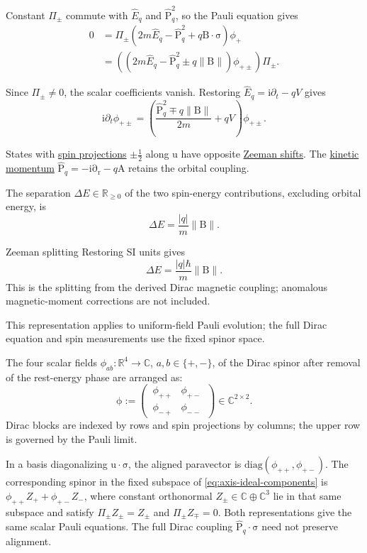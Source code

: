 \documentclass[11pt]{article}
\newcommand{\pv}[1]{{#1}}
\newcommand{\pvGreek}[1]{{#1}}
\newcommand{\vstyle}[1]{{\bm{\mathrm{#1}}}}
\newcommand{\pZ}{\pv{Z}}
\newcommand{\pvPi}{\pvGreek{\Pi}}
\newcommand{\pvphi}{\pvGreek{\phi}}
\numberwithin{equation}{section}
\newcommand{\R}{\mathbb{R}}
\newcommand{\C}{\mathbb{C}}
\newcommand{\ii}{\mathrm{i}}
\newcommand{\dotprod}{\cdot}
\newcommand{\bsig}{\vstyle{\sigma}}
\newcommand{\br}{\vstyle{r}}
\newcommand{\bBf}{\vstyle{B}}
\newcommand{\bp}{\vstyle{P}}
\newcommand{\hEq}{\hat E_q}
\newcommand{\hbpq}{\hat{\bp}_q}
\newcommand{\pdr}{\vstyle{\partial}_{\br}}
\begin{document}
Constant $\pvPi_\pm$ commute with $\hEq$ and $\hbpq^2$,
so the Pauli equation gives
\[
\begin{aligned}
0&=\pvPi_\pm(2m\hEq-\hbpq^2+q\vstyle{B}\dotprod\bsig)\pvphi_+\\
&=((2m\hEq-\hbpq^2
\pm q\lVert\vstyle{B}\rVert)\phi_{+\pm})\pvPi_\pm.
\end{aligned}
\]

Since $\pvPi_\pm\ne0$, the scalar coefficients vanish.
Restoring $\hEq=\ii\partial_t-qV$ gives
\[
\boxed{\ii\partial_t\phi_{+\pm}=
\left(\frac{\hbpq^2\mp q\lVert\vstyle{B}\rVert}{2m}+qV\right)\phi_{+\pm}.}
\]

States with \hyperref[sec:spin-half]{spin projections} $\pm\tfrac12$ along $\vstyle{u}$ have opposite
\hyperref[sec:uniform-spin]{Zeeman shifts}. The
\hyperref[eq:mechanical-momentum-operator]{kinetic momentum}
$\hbpq=-\ii\pdr-q\vstyle{A}$ retains the orbital coupling.

The separation $\Delta E\in\R_{\ge0}$ of the two spin-energy contributions, excluding
orbital energy, is
\[
 \Delta E=\frac{|q|}{m}\lVert\bBf\rVert.
\]
\begin{SIunits}{Zeeman splitting}
Restoring SI units gives
\[
 \Delta E=\frac{|q|\hbar}{m}\lVert\bBf\rVert.
\]
This is the splitting from the derived Dirac magnetic coupling; anomalous
magnetic-moment corrections are not included.
\end{SIunits}

This representation applies to uniform-field Pauli evolution; the full
Dirac equation and spin measurements use the fixed spinor space.

The four scalar fields $\phi_{ab}:\R^4\to\C$, $a,b\in\{+,-\}$,
of the Dirac spinor after removal of the rest-energy phase are arranged as:
\[
\vstyle{\phi}:=\left(\,\begin{matrix}
\phi_{++}&\phi_{+-}\\
\phi_{-+}&\phi_{--}
\end{matrix}\,\right)\in\C^{2\times2}.
\]
Dirac blocks are indexed by rows and spin projections by columns; the upper row is governed by the Pauli limit.

In a basis diagonalizing $\vstyle{u}\dotprod\bsig$, the aligned paravector is
$\mathrm{diag}(\phi_{++},\phi_{+-})$. The corresponding spinor in the
fixed subspace of \eqref{eq:axis-ideal-components} is
$\phi_{++}\pZ_++\phi_{+-}\pZ_-$, where constant orthonormal
$\pZ_\pm\in\C\oplus\C^3$ lie in that same subspace and satisfy
$\pvPi_\pm \pZ_\pm=\pZ_\pm$ and $\pvPi_\pm \pZ_\mp=0$.
Both representations give the same scalar Pauli equations.
The full Dirac coupling $\hbpq\dotprod\bsig$ need not preserve alignment.
\end{document}
